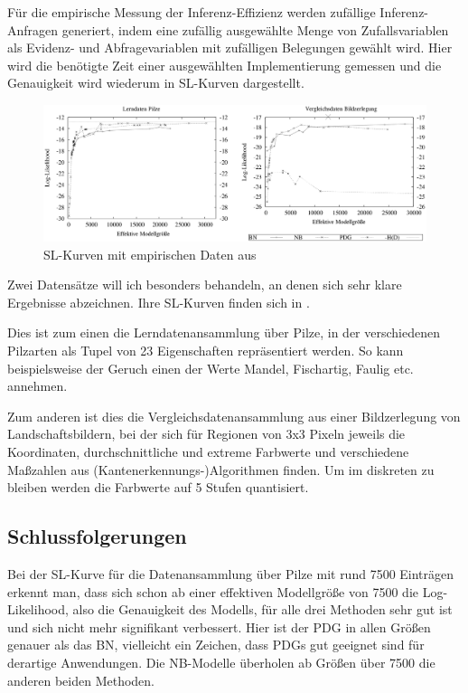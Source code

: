 \documentclass{llncs}
\begin{document}
Für die empirische Messung der Inferenz-Effizienz werden zufällige Inferenz-Anfragen generiert, indem eine zufällig ausgewählte Menge von Zufallsvariablen als Evidenz- und Abfragevariablen mit zufälligen Belegungen gewählt wird. Hier wird die benötigte Zeit einer ausgewählten Implementierung gemessen und die Genauigkeit wird wiederum in SL-Kurven dargestellt. 

\begin{figure}[H]
  \caption{\label{fig:datagraphs}SL-Kurven mit empirischen Daten aus \cite{nielsen2006empirical}}
  \centering
  \includegraphics{graphs.png}
\end{figure}

Zwei Datensätze will ich besonders behandeln, an denen sich sehr klare Ergebnisse abzeichnen. Ihre SL-Kurven finden sich in . 

Dies ist zum einen die Lerndatenansammlung über Pilze, in der verschiedenen Pilzarten als Tupel von 23 Eigenschaften repräsentiert werden. So kann beispielsweise der Geruch einen der Werte Mandel, Fischartig, Faulig etc. annehmen. 

Zum anderen ist dies die Vergleichsdatenansammlung aus einer Bildzerlegung von Landschaftsbildern, bei der sich für Regionen von 3x3 Pixeln jeweils die Koordinaten, durchschnittliche und extreme Farbwerte und verschiedene Maßzahlen aus (Kantenerkennungs-)Algorithmen finden. Um im diskreten zu bleiben werden die Farbwerte auf 5 Stufen quantisiert. 

\subsection{Schlussfolgerungen}

Bei der SL-Kurve für die Datenansammlung über Pilze mit rund 7500 Einträgen erkennt man, dass sich schon ab einer effektiven Modellgröße von 7500 die Log-Likelihood, also die Genauigkeit des Modells, für alle drei Methoden sehr gut ist und sich nicht mehr signifikant verbessert. Hier ist der PDG in allen Größen genauer als das BN, vielleicht ein Zeichen, dass PDGs gut geeignet sind für derartige Anwendungen. Die NB-Modelle überholen ab Größen über 7500 die anderen beiden Methoden. 
\end{document}
